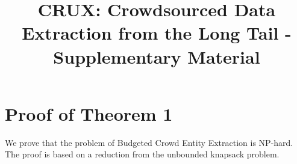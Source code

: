 \documentclass[conference]{IEEEtran}
\begin{document}

\title{CRUX: Crowdsourced Data Extraction from the Long Tail - Supplementary Material} 
%

\author{
\and
{}
\and
{}
}

\maketitle

\section{Proof of Theorem 1}
\label{sec:prth1}
We prove that the problem of Budgeted Crowd Entity Extraction is NP-hard. The proof is based on a reduction from the unbounded knapsack problem.
\end{document}
